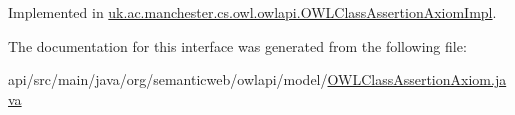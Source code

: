 Implemented in \hyperlink{classuk_1_1ac_1_1manchester_1_1cs_1_1owl_1_1owlapi_1_1_o_w_l_class_assertion_axiom_impl_ac9334a4c71033833d0449341951450f7}{uk.\-ac.\-manchester.\-cs.\-owl.\-owlapi.\-O\-W\-L\-Class\-Assertion\-Axiom\-Impl}.



The documentation for this interface was generated from the following file\-:\begin{DoxyCompactItemize}
\item 
api/src/main/java/org/semanticweb/owlapi/model/\hyperlink{_o_w_l_class_assertion_axiom_8java}{O\-W\-L\-Class\-Assertion\-Axiom.\-java}\end{DoxyCompactItemize}
